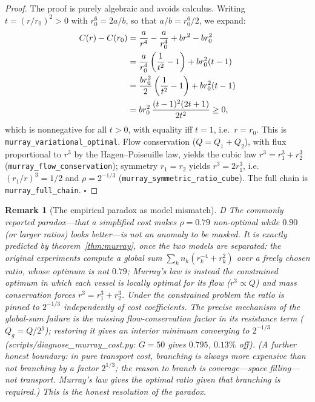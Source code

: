 \documentclass[journal]{IEEEtran}
\newtheorem{remark}{Remark}
\begin{document}
\begin{proof}
The proof is purely algebraic and avoids calculus. Writing
$t=(r/r_0)^2>0$ with $r_0^6=2a/b$, so that $a/b = r_0^6/2$, we expand:
\begin{align}
C(r)-C(r_0)
&= \frac{a}{r^4}-\frac{a}{r_0^4} + b r^2 - b r_0^2 \notag\\
&= \frac{a}{r_0^4}\left(\frac{1}{t^2}-1\right)
   + b r_0^2 (t-1) \notag\\
&= \frac{b r_0^2}{2}\left(\frac{1}{t^2}-1\right)
   + b r_0^2 (t-1) \notag\\
&= b r_0^2\,\frac{(t-1)^2(2t+1)}{2t^2} \ge 0,
\label{eq:murray}
\end{align}
which is nonnegative for all $t>0$, with equality iff $t=1$, i.e.\ $r=r_0$.
This is \texttt{murray\_variational\_optimal}. Flow conservation
($Q=Q_1+Q_2$), with flux proportional to $r^3$ by the Hagen--Poiseuille law,
yields the cubic law $r^3=r_1^3+r_2^3$
(\texttt{murray\_flow\_conservation}); symmetry $r_1=r_2$ yields
$r^3=2r_1^3$, i.e.\ $(r_1/r)^3=1/2$ and $\rho=2^{-1/3}$
(\texttt{murray\_symmetric\_ratio\_cube}). The full chain is
\texttt{murray\_full\_chain}. \hfill$\square$
\end{proof}

\begin{remark}[The empirical paradox as model mismatch]
\label{rem:paradox}
D
The commonly reported paradox---that a simplified cost makes $\rho=0.79$
non-optimal while $0.90$ (or larger ratios) looks better---is not an anomaly
to be masked. It is exactly predicted by theorem~\ref{thm:murray}, once the
two models are separated: the original experiments compute a \emph{global sum}
$\sum_k n_k(r_k^{-4}+r_k^2)$ over a freely chosen ratio, whose optimum is not
$0.79$; Murray's law is instead the \emph{constrained} optimum in which each
vessel is locally optimal for its flow ($r^3\propto Q$) and mass conservation
forces $r^3=r_1^3+r_2^3$. Under the constrained problem the ratio is pinned to
$2^{-1/3}$ independently of cost coefficients. The precise mechanism of the
global-sum failure is the missing flow-conservation factor in its resistance
term ($Q_g=Q/2^g$); restoring it gives an interior minimum converging to
$2^{-1/3}$ (scripts/diagnose\_murray\_cost.py: $G{=}50$ gives $0.795$,
$0.13\%$ off). (A further honest boundary: in
pure transport cost, branching is always more expensive than not branching by a
factor $2^{1/3}$; the \emph{reason} to branch is coverage---space filling---not
transport. Murray's law gives the optimal ratio \emph{given} that branching is
required.) This is the honest resolution of the paradox.
\end{remark}
\end{document}

